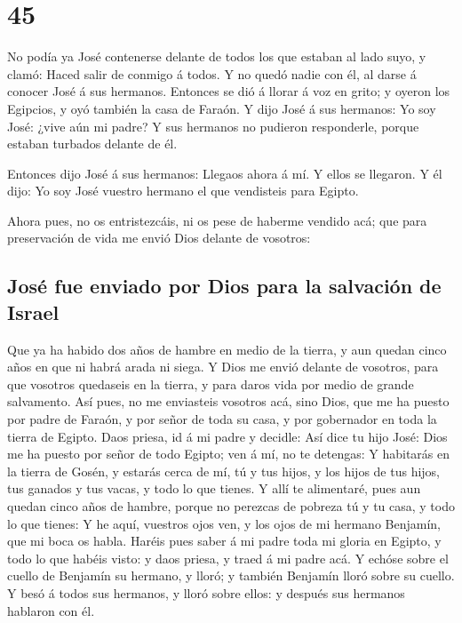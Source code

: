 \hypertarget{section-44}{%
\section{45}\label{section-44}}

 No podía ya José contenerse delante de todos los que
estaban al lado suyo, y clamó: Haced salir de conmigo á todos. Y no
quedó nadie con él, al darse á conocer José á sus hermanos.
 Entonces se dió á llorar á voz en grito; y oyeron los
Egipcios, y oyó también la casa de Faraón.  Y dijo José á
sus hermanos: Yo soy José: ¿vive aún mi padre? Y sus hermanos no
pudieron responderle, porque estaban turbados delante de él.

 Entonces dijo José á sus hermanos: Llegaos ahora á mí. Y
ellos se llegaron. Y él dijo: Yo soy José vuestro hermano el que
vendisteis para Egipto.

 Ahora pues, no os entristezcáis, ni os pese de haberme
vendido acá; que para preservación de vida me envió Dios delante de
vosotros:

\hypertarget{josuxe9-fue-enviado-por-dios-para-la-salvaciuxf3n-de-israel}{%
\subsection{José fue enviado por Dios para la salvación de
Israel}\label{josuxe9-fue-enviado-por-dios-para-la-salvaciuxf3n-de-israel}}

 Que ya ha habido dos años de hambre en medio de la
tierra, y aun quedan cinco años en que ni habrá arada ni siega.
 Y Dios me envió delante de vosotros, para que vosotros
quedaseis en la tierra, y para daros vida por medio de grande
salvamento.  Así pues, no me enviasteis vosotros acá, sino
Dios, que me ha puesto por padre de Faraón, y por señor de toda su casa,
y por gobernador en toda la tierra de Egipto.  Daos
priesa, id á mi padre y decidle: Así dice tu hijo José: Dios me ha
puesto por señor de todo Egipto; ven á mí, no te detengas:
 Y habitarás en la tierra de Gosén, y estarás cerca de
mí, tú y tus hijos, y los hijos de tus hijos, tus ganados y tus vacas, y
todo lo que tienes.  Y allí te alimentaré, pues aun
quedan cinco años de hambre, porque no perezcas de pobreza tú y tu casa,
y todo lo que tienes:  Y he aquí, vuestros ojos ven, y
los ojos de mi hermano Benjamín, que mi boca os habla. 
Haréis pues saber á mi padre toda mi gloria en Egipto, y todo lo que
habéis visto: y daos priesa, y traed á mi padre acá.  Y
echóse sobre el cuello de Benjamín su hermano, y lloró; y también
Benjamín lloró sobre su cuello.  Y besó á todos sus
hermanos, y lloró sobre ellos: y después sus hermanos hablaron con él.

